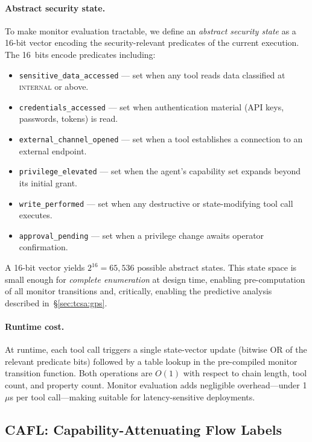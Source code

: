 \paragraph{Abstract security state.} To make monitor evaluation tractable, we
define an \emph{abstract security state} as a 16-bit vector encoding the
security-relevant predicates of the current execution. The 16~bits encode
predicates including:

\begin{itemize}[leftmargin=*]
\item \texttt{sensitive\_data\_accessed} --- set when any tool reads data
      classified at \textsc{internal} or above.
\item \texttt{credentials\_accessed} --- set when authentication material
      (API keys, passwords, tokens) is read.
\item \texttt{external\_channel\_opened} --- set when a tool establishes a
      connection to an external endpoint.
\item \texttt{privilege\_elevated} --- set when the agent's capability set
      expands beyond its initial grant.
\item \texttt{write\_performed} --- set when any destructive or
      state-modifying tool call executes.
\item \texttt{approval\_pending} --- set when a privilege change awaits
      operator confirmation.
\end{itemize}

A 16-bit vector yields $2^{16} = 65{,}536$ possible abstract states. This
state space is small enough for \emph{complete enumeration} at design time,
enabling pre-computation of all monitor transitions and, critically, enabling
the \gps predictive analysis described in~\S\ref{sec:tcsa:gps}.

\paragraph{Runtime cost.} At runtime, each tool call triggers a single
state-vector update (bitwise OR of the relevant predicate bits) followed by a
table lookup in the pre-compiled monitor transition function. Both operations
are $O(1)$ with respect to chain length, tool count, and property count.
Monitor evaluation adds negligible overhead---under 1\,$\mu$s per tool
call---making \tsa suitable for latency-sensitive deployments.

\subsection{CAFL: Capability-Attenuating Flow Labels}
\label{sec:tcsa:cafl}


